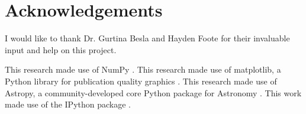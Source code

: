\documentclass[linenumbers]{aastex631} %
\begin{document}
\section{Acknowledgements}
I would like to thank Dr. Gurtina Besla and Hayden Foote for their invaluable input and help on this project.

This research made use of NumPy \citep{harris2020array}. This research made use of matplotlib, a Python library for publication quality graphics \citep{Hunter:2007}. This research made use of Astropy, a community-developed core Python package for Astronomy \citep{2018AJ....156..123A, 2013A&A...558A..33A}. This work made use of the IPython package \citep{PER-GRA:2007}.

{}

\end{document}
